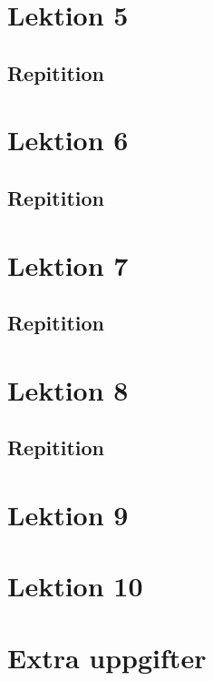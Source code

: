 \documentclass{article}%
\begin{document}
\section{Lektion 5}
\subsection{Repitition}
\section{Lektion 6}
\subsection{Repitition}
\section{Lektion 7}
\subsection{Repitition}
\section{Lektion 8}
\subsection{Repitition}
\section{Lektion 9}
\section{Lektion 10}
\section{Extra uppgifter}
%
\end{document}
